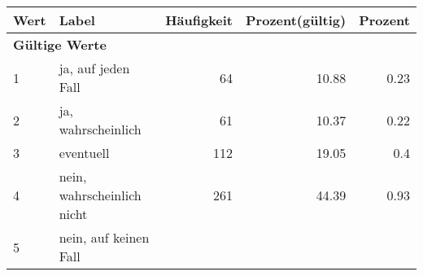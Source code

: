      \begin{longtable}{lXrrr}
     \toprule
     \textbf{Wert} & \textbf{Label} & \textbf{Häufigkeit} & \textbf{Prozent(gültig)} & \textbf{Prozent} \\
     \endhead
     \midrule
     \multicolumn{5}{l}{\textbf{Gültige Werte}}\\

     1 &
     \multicolumn{1}{X}{ ja, auf jeden Fall   } &


       \num{64} &
       \num[round-mode=places,round-precision=2]{10.88} &
         \num[round-mode=places,round-precision=2]{0.23} \\

     2 &
     \multicolumn{1}{X}{ ja, wahrscheinlich   } &


       \num{61} &
       \num[round-mode=places,round-precision=2]{10.37} &
         \num[round-mode=places,round-precision=2]{0.22} \\

     3 &
     \multicolumn{1}{X}{ eventuell   } &


       \num{112} &
       \num[round-mode=places,round-precision=2]{19.05} &
         \num[round-mode=places,round-precision=2]{0.4} \\

     4 &
     \multicolumn{1}{X}{ nein, wahrscheinlich nicht   } &


       \num{261} &
       \num[round-mode=places,round-precision=2]{44.39} &
         \num[round-mode=places,round-precision=2]{0.93} \\

     5 &
     \multicolumn{1}{X}{ nein, auf keinen Fall   } &



\end{longtable}
